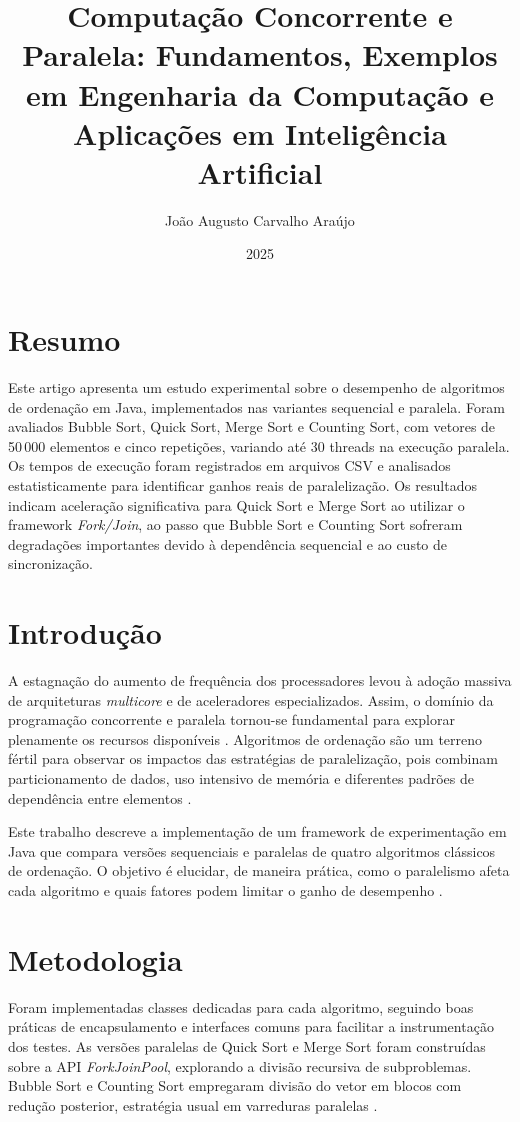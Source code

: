 \documentclass[11pt,twoside,a4paper]{article}
\date{2025}
\title{Computação Concorrente e Paralela: Fundamentos, Exemplos em Engenharia da Computação e Aplicações em Inteligência Artificial}
\author[1]{João Augusto Carvalho Araújo}
\affil[1]{Universidade de Fortaleza - Engenharia da Computação}
\begin{document}
\inserirtitulo
\linespread{1.5}

\section{Resumo}
\par Este artigo apresenta um estudo experimental sobre o desempenho de algoritmos de ordenação em Java, implementados nas variantes sequencial e paralela. Foram avaliados Bubble Sort, Quick Sort, Merge Sort e Counting Sort, com vetores de 50\,000 elementos e cinco repetições, variando até 30 threads na execução paralela. Os tempos de execução foram registrados em arquivos CSV e analisados estatisticamente para identificar ganhos reais de paralelização. Os resultados indicam aceleração significativa para Quick Sort e Merge Sort ao utilizar o framework \textit{Fork/Join}, ao passo que Bubble Sort e Counting Sort sofreram degradações importantes devido à dependência sequencial e ao custo de sincronização.

\section{Introdução}
\par A estagnação do aumento de frequência dos processadores levou à adoção massiva de arquiteturas \textit{multicore} e de aceleradores especializados. Assim, o domínio da programação concorrente e paralela tornou-se fundamental para explorar plenamente os recursos disponíveis \cite{tanenbaum2015mos,herlihy2020art}. Algoritmos de ordenação são um terreno fértil para observar os impactos das estratégias de paralelização, pois combinam particionamento de dados, uso intensivo de memória e diferentes padrões de dependência entre elementos \cite{cormen2022clrs}.

\par Este trabalho descreve a implementação de um framework de experimentação em Java que compara versões sequenciais e paralelas de quatro algoritmos clássicos de ordenação. O objetivo é elucidar, de maneira prática, como o paralelismo afeta cada algoritmo e quais fatores podem limitar o ganho de desempenho \cite{mccool2012structured}.

\section{Metodologia}
\par Foram implementadas classes dedicadas para cada algoritmo, seguindo boas práticas de encapsulamento e interfaces comuns para facilitar a instrumentação dos testes. As versões paralelas de Quick Sort e Merge Sort foram construídas sobre a API \textit{ForkJoinPool}, explorando a divisão recursiva de subproblemas. Bubble Sort e Counting Sort empregaram divisão do vetor em blocos com redução posterior, estratégia usual em varreduras paralelas \cite{mccool2012structured}.
\end{document}
